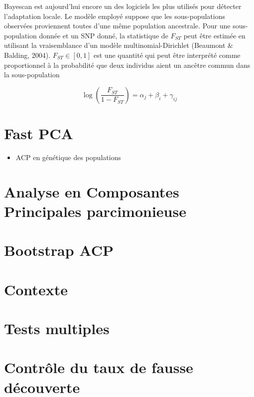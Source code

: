 \documentclass[12pt,twoside]{reedthesis}
\providecommand{\tightlist}{%
  \setlength{\itemsep}{0pt}\setlength{\parskip}{0pt}}
\begin{document}
  Bayescan est aujourd'hui encore un des logiciels les plus utilisés pour
  détecter l'adaptation locale. Le modèle employé suppose que les
  sous-populations observées proviennent toutes d'une même population
  ancestrale. Pour une sous-population donnée et un SNP donné, la
  statistique de \(F_{ST}\) peut être estimée en utilisant la
  vraisemblance d'un modèle multinomial-Dirichlet (Beaumont \& Balding,
  2004). \(F_{ST} \in [0, 1]\) est une quantité qui peut être interprété
  comme proportionnel à la probabilité que deux individus aient un ancêtre
  commun dans la sous-population
  
  \begin{equation} 
    \log \left( \frac{F_{ST}}{1 - F_{ST}} \right) = \alpha_j + \beta_i + \gamma_{ij}
    \label{eq:Bayescan-statistic}
  \end{equation}
  
  \section{Fast PCA}\label{fast-pca}
  
  \begin{itemize}
  \tightlist
  \item
    ACP en génétique des populations
  \end{itemize}
  
  \section{Analyse en Composantes Principales
  parcimonieuse}\label{analyse-en-composantes-principales-parcimonieuse}
  
  \section{Bootstrap ACP}\label{bootstrap-acp}
  
  \section{Contexte}\label{contexte}
  
  \section{Tests multiples}\label{tests-multiples}
  
  \section{Contrôle du taux de fausse
  découverte}\label{controle-du-taux-de-fausse-decouverte}
  
\end{document}

